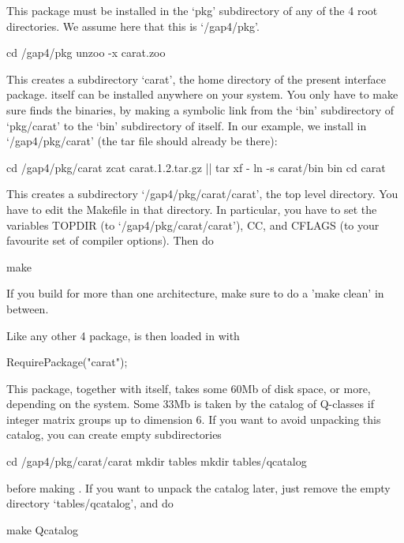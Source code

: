 
This package must be installed in the `pkg' subdirectory of any of
the {\GAP} 4 root directories. We assume here that this is `/gap4/pkg'.

\begintt
cd /gap4/pkg
unzoo -x carat.zoo
\endtt

This creates a subdirectory `carat', the home directory of the present
interface package. {\CARAT} itself can be installed anywhere on your 
system. You only have to make sure {\GAP} finds the {\CARAT} binaries, 
by making a symbolic link from the `bin' subdirectory of `pkg/carat' to 
the `bin' subdirectory of {\CARAT} itself. In our example, we install 
{\CARAT} in `/gap4/pkg/carat' (the {\CARAT} tar file should already be 
there):

\begintt
cd /gap4/pkg/carat
zcat carat.1.2.tar.gz || tar xf -
ln -s carat/bin bin
cd carat
\endtt

This creates a subdirectory `/gap4/pkg/carat/carat', the {\CARAT} top level
directory. You have to edit the Makefile in that directory. In particular,
you have to set the variables TOPDIR (to `/gap4/pkg/carat/carat'), CC, and
CFLAGS (to your favourite set of compiler options). Then do 

\begintt
make
\endtt

If you build for more than one architecture, make sure to do a 
'make clean' in between.

Like any other {\GAP} 4 package, {\CARAT} is then loaded in {\GAP} with

\beginexample
RequirePackage("carat");
\endexample

This package, together with {\CARAT} itself, takes some 60Mb of disk space,
or more, depending on the system. Some 33Mb is taken by the catalog
of Q-classes if integer matrix groups up to dimension 6. If you want
to avoid unpacking this catalog, you can create empty subdirectories

\begintt
cd /gap4/pkg/carat/carat
mkdir tables
mkdir tables/qcatalog
\endtt

before making {\CARAT}. If you want to unpack the catalog later, just
remove the empty directory `tables/qcatalog', and do

\begintt
make Qcatalog
\endtt


